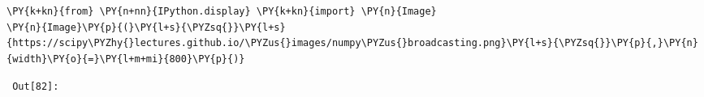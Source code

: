 {\par%
\vspace{-1\baselineskip}%
}%
\begin{notebookcell}[82]%
\begin{addmargin}[\cellleftmargin]{0em}%
{\smaller%
\par%
%
\vspace{-1\smallerfontscale}%
\begin{Verbatim}[commandchars=\\\{\}]
\PY{k+kn}{from} \PY{n+nn}{IPython.display} \PY{k+kn}{import} \PY{n}{Image}
\PY{n}{Image}\PY{p}{(}\PY{l+s}{\PYZsq{}}\PY{l+s}{https://scipy\PYZhy{}lectures.github.io/\PYZus{}images/numpy\PYZus{}broadcasting.png}\PY{l+s}{\PYZsq{}}\PY{p}{,}\PY{n}{width}\PY{o}{=}\PY{l+m+mi}{800}\PY{p}{)}
\end{Verbatim}
%
\par%
\vspace{-1\smallerfontscale}}%
\end{addmargin}
\end{notebookcell}

\par\vspace{1\smallerfontscale}%
    
        {\par%
        \vspace{-1\smallerfontscale}%
        \noindent%
        \begin{minipage}{\cellleftmargin}%
    \hfill%
    {\smaller%
    \tt%
    \color{nbframe-out-prompt}%
    Out[82]:}%
    \hspace{\inputpadding}%
    \hspace{0em}%
    \hspace{3pt}%
    \end{minipage}%
        }%
    \begin{addmargin}[\cellleftmargin]{0em}%
    {\smaller%
    \vspace{-1\smallerfontscale}%
    
    
    \begin{center}
    \end{center}
    { \hspace*{\fill} \\}
    
}%
    \end{addmargin}%

